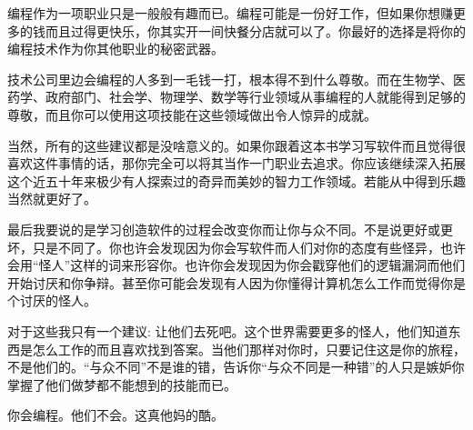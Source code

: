 编程作为一项职业只是一般般有趣而已。编程可能是一份好工作，但如果你想赚更多的钱而且过得更快乐，你其实开一间快餐分店就可以了。你最好的选择是将你的编程技术作为你其他职业的秘密武器。

技术公司里边会编程的人多到一毛钱一打，根本得不到什么尊敬。而在生物学、医药学、政府部门、社会学、物理学、数学等行业领域从事编程的人就能得到足够的尊敬，而且你可以使用这项技能在这些领域做出令人惊异的成就。

当然，所有的这些建议都是没啥意义的。如果你跟着这本书学习写软件而且觉得很喜欢这件事情的话，那你完全可以将其当作一门职业去追求。你应该继续深入拓展这个近五十年来极少有人探索过的奇异而美妙的智力工作领域。若能从中得到乐趣当然就更好了。

最后我要说的是学习创造软件的过程会改变你而让你与众不同。不是说更好或更坏，只是不同了。你也许会发现因为你会写软件而人们对你的态度有些怪异，也许会用“怪人”这样的词来形容你。也许你会发现因为你会戳穿他们的逻辑漏洞而他们开始讨厌和你争辩。甚至你可能会发现有人因为你懂得计算机怎么工作而觉得你是个讨厌的怪人。

对于这些我只有一个建议: 让他们去死吧。这个世界需要更多的怪人，他们知道东西是怎么工作的而且喜欢找到答案。当他们那样对你时，只要记住这是你的旅程，不是他们的。“与众不同”不是谁的错，告诉你“与众不同是一种错”的人只是嫉妒你掌握了他们做梦都不能想到的技能而已。

你会编程。他们不会。这真他妈的酷。
